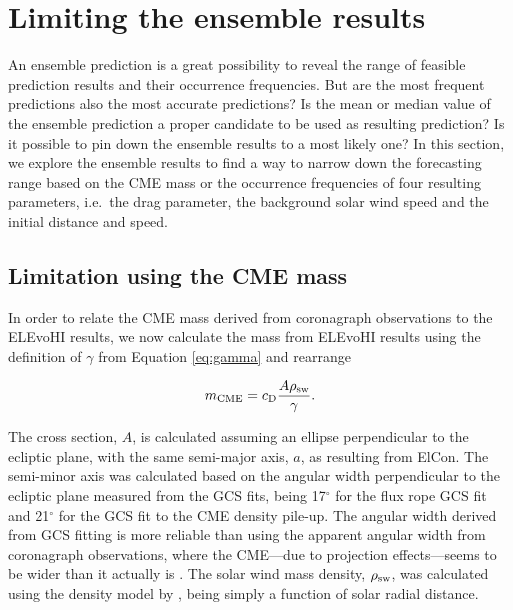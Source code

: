 \documentclass[draft]{agujournal}
\begin{document}
\section{Limiting the ensemble results}

An ensemble prediction is a great possibility to reveal the range of feasible prediction results and their occurrence frequencies. But are the most frequent predictions also the most accurate predictions? Is the mean or median value of the ensemble prediction a proper candidate to be used as resulting prediction? Is it possible to pin down the ensemble results to a most likely one? In this section, we explore the ensemble results to find a way to narrow down the forecasting range based on the CME mass or the occurrence frequencies of four resulting parameters, i.e.\ the drag parameter, the background solar wind speed and the initial distance and speed.

\subsection{Limitation using the CME mass}

In order to relate the CME mass derived from coronagraph observations to the ELEvoHI results, we now calculate the mass from ELEvoHI results using the definition of $\gamma$ from Equation \ref{eq:gamma} and rearrange

\begin{equation}
m_{\rm CME}=c_{\rm D} \frac{A \rho_{\rm sw}}{\gamma}.
\label{eq:mass_DBM}
\end{equation}

The cross section, $A$, is calculated assuming an ellipse perpendicular to the ecliptic plane, with the same semi-major axis, $a$, as resulting from ElCon. The semi-minor axis was calculated based on the angular width perpendicular to the ecliptic plane measured from the GCS fits, being 17$^\circ$ for the flux rope GCS fit and 21$^\circ$ for the GCS fit to the CME density pile-up. The angular width derived from GCS fitting is more reliable than using the apparent angular width from coronagraph observations, where the CME---due to projection effects---seems to be wider than it actually is \citep[][]{vrs07,wuche11}. The solar wind mass density, $\rho_{\rm sw}$, was calculated using the density model by \citet{leb98}, being simply a function of solar radial distance.
\end{document}
